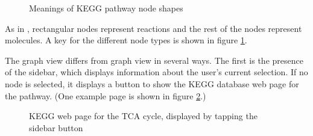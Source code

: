 \begin{figure}[hbt]
    \caption{\label{fig:kegg_node_legend} Meanings of KEGG pathway node shapes}
\end{figure}

As in \mawapp, rectangular nodes represent reactions and the rest of the nodes
represent molecules. A key for the different node types is shown in figure
\ref{fig:kegg_node_legend}.

The graph view differs from \mawappp graph view in several ways. The first
is the presence of the sidebar, which displays information about the user's
current selection. If no node is selected, it displays a button to show the KEGG
database web page for the pathway. (One example page is shown in figure
\ref{fig:kegg_screenshot_kegg_web_site}.)

\begin{figure}[hbt]
    \caption{\label{fig:kegg_screenshot_kegg_web_site} KEGG web page for the TCA
    cycle, displayed by tapping the sidebar button}
\end{figure}

